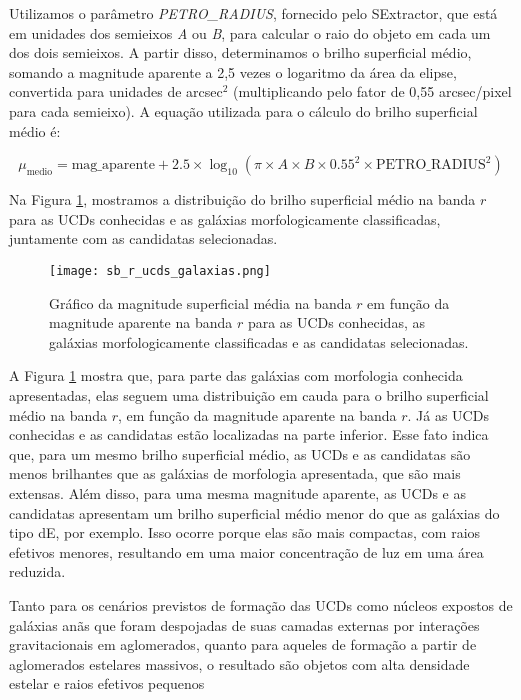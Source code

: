 Utilizamos o parâmetro \textit{PETRO\_RADIUS}, fornecido pelo SExtractor, que está em unidades dos semieixos \textit{A} ou \textit{B}, para calcular o raio do objeto em cada um dos dois semieixos. A partir disso, determinamos o brilho superficial médio, somando a magnitude aparente a 2,5 vezes o logaritmo da área da elipse, convertida para unidades de arcsec$^2$ (multiplicando pelo fator de 0,55 arcsec/pixel para cada semieixo). A equação utilizada para o cálculo do brilho superficial médio é:

\begin{equation}
    \mu_{\text{medio}} = \text{mag\_aparente} + 2.5 \times \log_{10}(\pi \times A \times B \times 0.55^2 \times \text{PETRO\_RADIUS}^2)
    \label{equation_sb}
\end{equation}

Na Figura \ref{sb_r_ucds_galaxias}, mostramos a distribuição do brilho superficial médio na banda $r$ para as UCDs conhecidas e as galáxias morfologicamente classificadas, juntamente com as candidatas selecionadas.

\begin{figure}[!ht]
    \begin{center}
    \texttt{[image: sb\_r\_ucds\_galaxias.png]}
    \caption[]{Gráfico da magnitude superficial média na banda $r$ em função da magnitude aparente na banda $r$ para as UCDs conhecidas, as galáxias morfologicamente classificadas e as candidatas selecionadas.}
    \label{sb_r_ucds_galaxias}
    \end{center}
\end{figure}

A Figura \ref{sb_r_ucds_galaxias} mostra que, para parte das galáxias com morfologia conhecida apresentadas, elas seguem uma distribuição em cauda para o brilho superficial médio na banda $r$, em função da magnitude aparente na banda $r$. Já as UCDs conhecidas e as candidatas estão localizadas na parte inferior. Esse fato indica que, para um mesmo brilho superficial médio, as UCDs e as candidatas são menos brilhantes que as galáxias de morfologia apresentada, que são mais extensas. Além disso, para uma mesma magnitude aparente, as UCDs e as candidatas apresentam um brilho superficial médio menor do que as galáxias do tipo dE, por exemplo. Isso ocorre porque elas são mais compactas, com raios efetivos menores, resultando em uma maior concentração de luz em uma área reduzida.

Tanto para os cenários previstos de formação das UCDs como núcleos expostos de galáxias anãs que foram despojadas de suas camadas externas por interações gravitacionais em aglomerados, quanto para aqueles de formação a partir de aglomerados estelares massivos, o resultado são objetos com alta densidade estelar e raios efetivos pequenos

